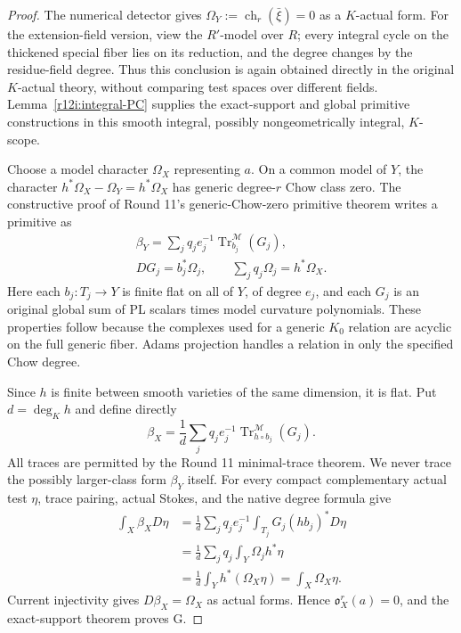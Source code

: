 \begin{proof}
The numerical detector gives
$\Omega_Y:=\operatorname{ch}_r(\bar\xi)=0$ as a $K$-actual form.
For the extension-field version, view the $R'$-model over $R$;
every integral cycle on the thickened special fiber lies on its
reduction, and the degree changes by the residue-field degree.
Thus this conclusion is again obtained directly in the original
$K$-actual theory, without comparing test spaces over different fields.
Lemma~\ref{r12i:integral-PC} supplies the exact-support and global
primitive constructions in this smooth integral, possibly
nongeometrically integral, $K$-scope.

Choose a model character $\Omega_X$ representing $a$.  On a common
model of $Y$, the character $h^*\Omega_X-\Omega_Y=h^*\Omega_X$ has
generic degree-$r$ Chow class zero.  The constructive proof of Round
11's generic-Chow-zero primitive theorem writes a primitive as
\[
\begin{gathered}
 \beta_Y=\sum_j q_j e_j^{-1}
                  \operatorname{Tr}^{\mathscr M}_{b_j}(G_j),\\
 DG_j=b_j^*\Omega_j,\qquad
 \sum_j q_j\Omega_j=h^*\Omega_X.
\end{gathered}
\tag{ND7}\label{r12a:primitive-generators}
\]
Here each $b_j:T_j\to Y$ is finite flat on all of $Y$, of degree
$e_j$, and each $G_j$ is an original global sum of PL scalars times
model curvature polynomials.  These properties follow because the
complexes used for a generic $K_0$ relation are acyclic on the full
generic fiber.  Adams projection handles a relation in only the
specified Chow degree.

Since $h$ is finite between smooth varieties of the same dimension,
it is flat.  Put $d=\deg_K h$ and define directly
\[
 \beta_X=\frac1d\sum_jq_j e_j^{-1}
                 \operatorname{Tr}^{\mathscr M}_{h\circ b_j}(G_j).
\tag{ND8}\label{r12a:finite-primitive}
\]
All traces are permitted by the Round 11 minimal-trace theorem.
We never trace the possibly larger-class form $\beta_Y$ itself.
For every compact complementary actual test $\eta$, trace pairing,
actual Stokes, and the native degree formula give
\[
\begin{aligned}
 \int_X\beta_XD\eta
 &=\frac1d\sum_jq_j e_j^{-1}
                  \int_{T_j}G_j(hb_j)^*D\eta\\
 &=\frac1d\sum_jq_j\int_Y\Omega_jh^*\eta\\
 &=\frac1d\int_Yh^*(\Omega_X\eta)
  =\int_X\Omega_X\eta.
\end{aligned}
\]
Current injectivity gives $D\beta_X=\Omega_X$ as actual forms.
Hence $\mathfrak o_X^r(a)=0$, and the exact-support theorem proves G.
\end{proof}

